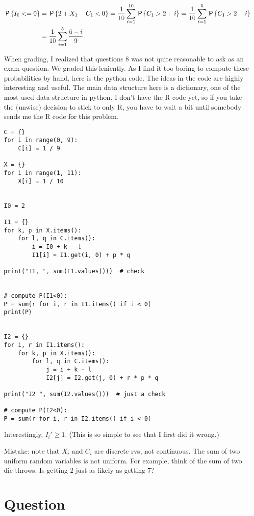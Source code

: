 \begin{exercise}
\begin{solution}
\begin{align}
\P{I_{0} < = 0} &= \P{2 + X_{1} - C_{1} < 0} = \frac{1}{10} \sum_{i=1}^{10} \P{C_{1} > 2 + i } = \frac{1}{10} \sum_{i=1}^{5} \P{C_{1} > 2 + i } \\
&= \frac{1}{10} \sum_{i=1}^{5} \frac{6-i}{9}.
\end{align}

When grading, I realized that questions 8 was not quite reasonable to ask as an exam question.
We graded this leniently.
As I find it too boring to compute these probabilities by hand, here is the python code.
The ideas in the code are highly interesting and useful.
The main data structure here is a dictionary, one of the most used data structure in python.
I don't have the R code yet, so if you take the (unwise) decision to stick to only R, you have to wait a bit until somebody sends me the R code for this problem.
\begin{verbatim}
C = {}
for i in range(0, 9):
    C[i] = 1 / 9

X = {}
for i in range(1, 11):
    X[i] = 1 / 10


I0 = 2

I1 = {}
for k, p in X.items():
    for l, q in C.items():
        i = I0 + k - l
        I1[i] = I1.get(i, 0) + p * q

print("I1, ", sum(I1.values()))  # check


# compute P(I1<0):
P = sum(r for i, r in I1.items() if i < 0)
print(P)


I2 = {}
for i, r in I1.items():
    for k, p in X.items():
        for l, q in C.items():
            j = i + k - l
            I2[j] = I2.get(j, 0) + r * p * q

print("I2 ", sum(I2.values()))  # just a check

# compute P(I2<0):
P = sum(r for i, r in I2.items() if i < 0)
\end{verbatim}

Interestingly, $I_{i}'\geq 1$. (This is so simple to see that I first did it wrong.)



Mistake: note that $X_{i}$   and $C_{i}$ are discrete rvs, not continuous.
The sum of two uniform random variables is not uniform. For example, think of the sum of two die throws. Is getting 2 just as likely as getting 7?
\end{solution}
\end{exercise}


\section*{Question}


